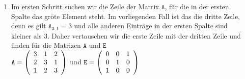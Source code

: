 \begin{enumerate}
\item Im ersten Schritt suchen wir die Zeile der Matrix $\mathtt{A}$, f\"{u}r die in der ersten Spalte
      das gr\"{o}\3te Element steht.  Im vorliegenden Fall ist das die dritte Zeile, denn es gilt $\mathtt{A}_{3,1} = 3$
      und alle anderen Eintr\"{a}ge in der ersten Spalte sind kleiner als $3$.  Daher vertauschen wir die
      erste Zeile mit der dritten Zeile und finden f\"{u}r die Matrizen $\mathtt{A}$ und $\mathtt{E}$
\\[0.2cm]
\hspace*{1.3cm}
$\mathtt{A} = \left(
  \begin{array}[c]{lll}
    3 & 1 & 2     \\
    2 & 3 & 1     \\
    1 & 2 & 3     
  \end{array}\right)
$ \quad und \quad
$\mathtt{E} = \left(
  \begin{array}[c]{lll}
    0 & 0 & 1     \\
    0 & 1 & 0     \\
    1 & 0 & 0            
  \end{array}\right)
$
\\[0.2cm]


\end{enumerate}

